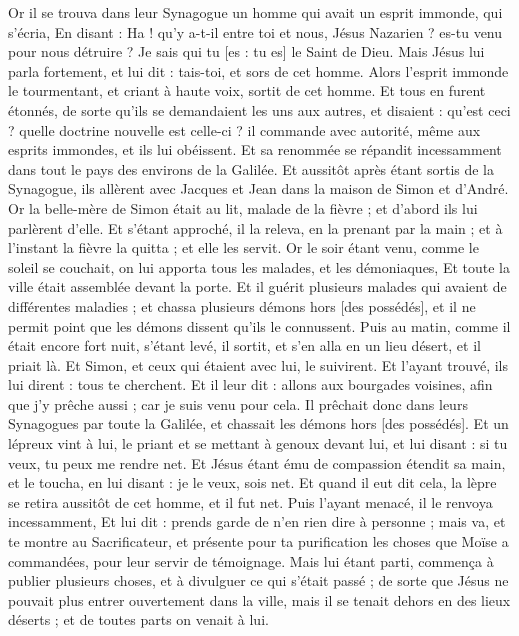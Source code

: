 \begin{multicols}{2}
Or il se trouva dans leur Synagogue un homme qui avait un esprit immonde, qui s'écria,
En disant : Ha ! qu'y a-t-il entre toi et nous, Jésus Nazarien ? es-tu venu pour nous détruire ? Je sais qui tu [es : tu es] le Saint de Dieu.
Mais Jésus lui parla fortement, et lui dit : tais-toi, et sors de cet homme.
Alors l'esprit immonde le tourmentant, et criant à haute voix, sortit de cet homme.
Et tous en furent étonnés, de sorte qu'ils se demandaient les uns aux autres, et disaient : qu'est ceci ? quelle doctrine nouvelle est celle-ci ? il commande avec autorité, même aux esprits immondes, et ils lui obéissent.
Et sa renommée se répandit incessamment dans tout le pays des environs de la Galilée.
Et aussitôt après étant sortis de la Synagogue, ils allèrent avec Jacques et Jean dans la maison de Simon et d'André.
Or la belle-mère de Simon était au lit, malade de la fièvre ; et d'abord ils lui parlèrent d'elle.
Et s'étant approché, il la releva, en la prenant par la main ; et à l'instant la fièvre la quitta ; et elle les servit.
Or le soir étant venu, comme le soleil se couchait, on lui apporta tous les malades, et les démoniaques,
Et toute la ville était assemblée devant la porte.
Et il guérit plusieurs malades qui avaient de différentes maladies ; et chassa plusieurs démons hors [des possédés], et il ne permit point que les démons dissent qu'ils le connussent.
Puis au matin, comme il était encore fort nuit, s'étant levé, il sortit, et s'en alla en un lieu désert, et il priait là.
Et Simon, et ceux qui étaient avec lui, le suivirent.
Et l'ayant trouvé, ils lui dirent : tous te cherchent.
Et il leur dit : allons aux bourgades voisines, afin que j'y prêche aussi ; car je suis venu pour cela.
Il prêchait donc dans leurs Synagogues par toute la Galilée, et chassait les démons hors [des possédés].
Et un lépreux vint à lui, le priant et se mettant à genoux devant lui, et lui disant : si tu veux, tu peux me rendre net.
Et Jésus étant ému de compassion étendit sa main, et le toucha, en lui disant : je le veux, sois net.
Et quand il eut dit cela, la lèpre se retira aussitôt de cet homme, et il fut net.
Puis l'ayant menacé, il le renvoya incessamment,
Et lui dit : prends garde de n'en rien dire à personne ; mais va, et te montre au Sacrificateur, et présente pour ta purification les choses que Moïse a commandées, pour leur servir de témoignage.
Mais lui étant parti, commença à publier plusieurs choses, et à divulguer ce qui s'était passé ; de sorte que Jésus ne pouvait plus entrer ouvertement dans la ville, mais il se tenait dehors en des lieux déserts ; et de toutes parts on venait à lui.

\end{multicols}
